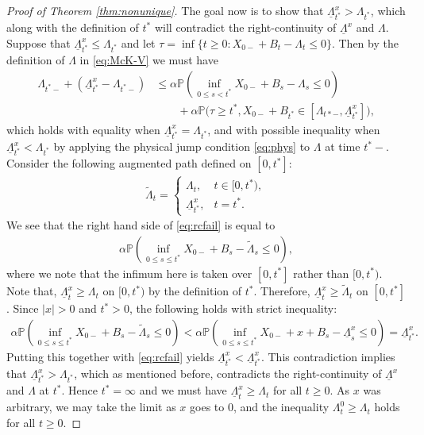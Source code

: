 \documentclass[12pt]{amsart}
\newcommand{\lb}{\left}
\newcommand{\rb}{\right}
\newcommand{\wt}{\widetilde}
\newcommand{\ubar}{\underline}
\newcommand{\bP}{\mathbb{P}}
\theoremstyle{plain}
\theoremstyle{definition}
\begin{document}
\begin{proof}[Proof of Theorem \ref{thm:nonunique}]
The goal now is to show that $\ubar{\Lambda}^x_{t^*}>\Lambda_{t^*}$, which along with the definition of $t^{*}$ will contradict the right-continuity of $\ubar{\Lambda}^x$ and $\Lambda$.
Suppose that $\ubar{\Lambda}^x_{t^*}\le\Lambda_{t^*}$ and let \newline ${\tau=\inf\{t\ge 0: X_{0-}+B_t-\Lambda_t\le 0\}}$. Then by the definition of $\Lambda$ in \eqref{eq:McK-V} we must have
\begin{equation}\label{eq:rcfail}
\begin{split}
\Lambda_{t^*-}+(\ubar{\Lambda}^x_{t^*}-\Lambda_{t^*-})&\le\alpha\bP \lb(\inf_{0\le s< t^*} X_{0-}+B_s-\Lambda_{s}\le 0\rb)\\
 &\quad\quad+\alpha\bP \bigg(\tau\ge t^*, X_{0-}+B_{t^*}\in[\Lambda_{t*-},\ubar{\Lambda}^x_{t^*}]\bigg),
\end{split}
\end{equation}
which holds with equality when $\ubar{\Lambda}^x_{t^*}=\Lambda_{t^*}$, and with possible inequality when $\ubar{\Lambda}^x_{t^*}<\Lambda_{t^*}$ by applying the physical jump condition \eqref{eq:phys} to $\Lambda$ at time $t^*-$. Consider the following augmented path defined on $[0,t^*]$:
\begin{align}
\wt{\Lambda}_t=
\begin{cases}
\Lambda_t, & t\in [0,t^*),\\
\ubar{\Lambda}^x_{t^*}, & t=t^*.
\end{cases}
\end{align}
We see that the right hand side of \eqref{eq:rcfail} is equal to 
\begin{align}
\alpha\bP \lb(\inf_{0\le s\le t^*} X_{0-}+B_s-\wt\Lambda_{s}\le 0\rb),
\end{align}
where we note that the infimum here is taken over $[0,t^*]$ rather than $[0,t^*)$.
Note that, ${\ubar{\Lambda}^x_t\ge\Lambda_t}$ on $[0,t^*)$ by the definition of $t^*$. Therefore, $\ubar{\Lambda}^x_t\ge\wt{\Lambda}_t$ on $[0,t^*]$. Since $|x|>0$ and $t^*>0$, the following holds with strict inequality:
\begin{align}
\alpha\bP \lb(\inf_{0\le s\le t^*} X_{0-}+B_s-\wt\Lambda_{s}\le 0\rb) < \alpha\bP \lb(\inf_{0\le s\le t^*} X_{0-}+x+B_s-\ubar{\Lambda}^x_{s}\le 0\rb)=\ubar{\Lambda}^x_{t^*}.
\end{align}
Putting this together with \eqref{eq:rcfail} yields $\ubar{\Lambda}^x_{t^*}<\ubar{\Lambda}^x_{t^*}$. This contradiction implies that ${\ubar{\Lambda}^x_{t^*}>\Lambda_{t^*}}$, which as mentioned before, contradicts the right-continuity of $\ubar{\Lambda}^x$ and $\Lambda$ at $t^*$. Hence ${t^*=\infty}$ and we must have $\ubar{\Lambda}^x_t\ge\Lambda_t$ for all $t\ge0$. As $x$ was arbitrary, we may take the limit as $x$ goes to 0, and the inequality $\Lambda^0_t\ge\Lambda_t$ holds for all $t\ge 0$.


\end{proof}
\end{document}
